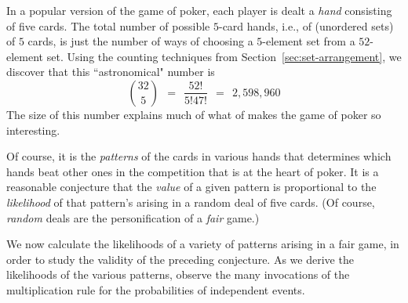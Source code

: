 \medskip

\noindent
In a popular version of the game of poker, each player is dealt a {\it hand} consisting of five cards.
The total number of possible $5$-card hands, i.e., of (unordered sets) of $5$ cards, is just the number
of ways of choosing a $5$-element set from a $52$-element set.  Using the counting techniques from
Section~\ref{sec:set-arrangement}, we discover that this ``astronomical" number is
\[
{32 \choose 5} \ \ = \ \ \frac{52!}{5! 47!} \ \ = \ \ 2,598,960 
\]
The size of this number explains much of what of makes the game of poker so interesting.

\medskip

Of course, it is the {\em patterns} of the cards in various hands that determines which hands
beat other ones in the competition that is at the heart of poker.  It is a reasonable
conjecture that the {\em value} of a given pattern is proportional to the {\em likelihood}
of that pattern's arising in a random deal of five cards.  (Of course, {\em random} deals are 
the personification of a {\em fair} game.)

We now calculate the likelihoods of a variety of patterns arising in a fair game, in order to study
the validity of the preceding conjecture.  As we derive the likelihoods of the various patterns,
observe the many invocations of the multiplication rule for the probabilities of independent
events.

\medskip

